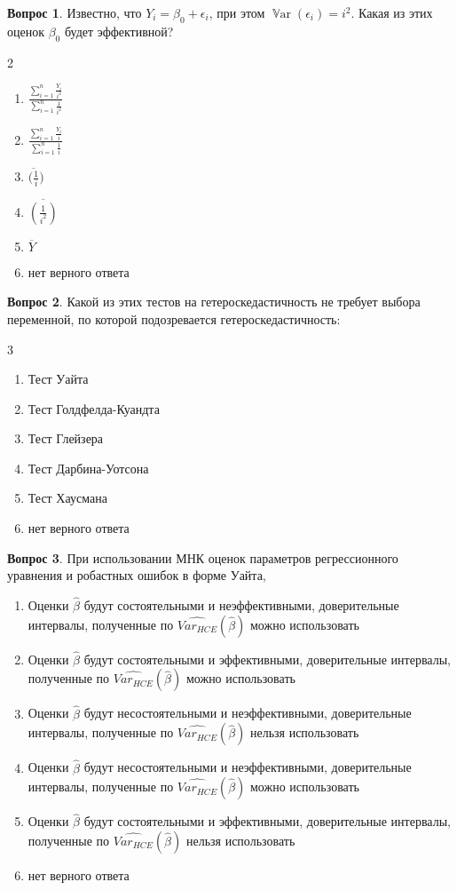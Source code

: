 \documentclass[12pt]{article}
\DeclareMathOperator{\Var}{\mathbb{V}ar}
\newenvironment{answerlist}[1][3]{
\begin{multicols}{#1}
\begin{enumerate}[label=\fbox{\emph{\Alph*}},ref=\emph{\alph*}]
}
{
\end{enumerate}
\end{multicols}
}
\newenvironment{answerlist1}{
\begin{enumerate}[label=\fbox{\emph{\Alph*}},ref=\emph{\alph*}]
}
{
\end{enumerate}
}
\theoremstyle{definition}
\newtheorem{question}{Вопрос}
\begin{document}
\begin{question}
Известно, что \( Y_i = \beta_0 + \epsilon_i \), при этом \( \Var(\epsilon_i)=i^2 \). 
Какая из этих оценок  \( \beta_0 \) будет эффективной?

\begin{answerlist}[2]
  \item \( \frac{\sum_{i=1}^{n} \frac{Y_i}{i^2}}{\sum_{i=1}^{n} \frac{1}{i^2}} \)
  \item \( \frac{\sum_{i=1}^{n} \frac{Y_i}{i}}{\sum_{i=1}^{n} \frac{1}{i}} \)
  \item \( \overline{(\frac{1}{i}}) \)
  \item \( \overline{(\frac{1}{i^2})} \)
  \item \( \overline Y \)
  \item нет верного ответа
\end{answerlist}
\end{question}

\begin{question}
Какой из этих тестов на гетероскедастичность не требует выбора переменной, 
  по которой подозревается гетероскедастичность:
\begin{answerlist}
  \item Тест Уайта
  \item Тест Голдфелда-Куандта
  \item Тест Глейзера
  \item Тест Дарбина-Уотсона
  \item Тест Хаусмана
  \item нет верного ответа
\end{answerlist}
\end{question}


\begin{question}
При использовании МНК оценок параметров регрессионного уравнения и робастных ошибок в форме Уайта,
\begin{answerlist1}
\item Оценки \( \widehat{\beta} \)  будут состоятельными и неэффективными, доверительные интервалы, 
полученные по \( \widehat{Var_{HCE}} (\widehat{\beta}) \) можно использовать
\item Оценки \( \widehat{\beta} \) будут состоятельными и эффективными, доверительные интервалы, 
полученные по  \( \widehat{Var_{HCE}} (\widehat{\beta}) \)  можно использовать
\item Оценки \( \widehat{\beta} \)  будут несостоятельными и неэффективными, доверительные интервалы, 
полученные по  \( \widehat{Var_{HCE}} (\widehat{\beta}) \)   нельзя использовать
\item Оценки \( \widehat{\beta} \)  будут несостоятельными и неэффективными, доверительные интервалы, 
полученные по  \( \widehat{Var_{HCE}} (\widehat{\beta}) \)   можно использовать
\item Оценки \( \widehat{\beta} \)  будут состоятельными и эффективными, доверительные интервалы, 
полученные по  \( \widehat{Var_{HCE}} (\widehat{\beta}) \)   нельзя использовать
\item нет верного ответа
\end{answerlist1}
\end{question}
\end{document}
